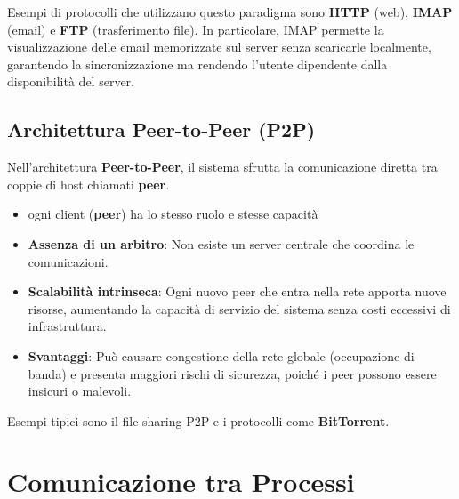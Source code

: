 \documentclass[12pt,a4paper,oneside]{book}
\begin{document}
Esempi di protocolli che utilizzano questo paradigma sono \textbf{HTTP} (web), \textbf{IMAP} (email) e \textbf{FTP} (trasferimento file). In particolare, IMAP permette la visualizzazione delle email memorizzate sul server senza scaricarle localmente, garantendo la sincronizzazione ma rendendo l'utente dipendente dalla disponibilità del server.

\subsection{Architettura Peer-to-Peer (P2P)}

Nell'architettura \textbf{Peer-to-Peer}, il sistema sfrutta la comunicazione diretta tra coppie di host chiamati \textbf{peer}.

\begin{itemize}
    \item ogni client (\textbf{peer}) ha lo stesso ruolo e stesse capacità
    \item \textbf{Assenza di un arbitro}: Non esiste un server centrale che coordina le comunicazioni.
    \item \textbf{Scalabilità intrinseca}: Ogni nuovo peer che entra nella rete apporta nuove risorse, aumentando la capacità di servizio del sistema senza costi eccessivi di infrastruttura.
    \item \textbf{Svantaggi}: Può causare congestione della rete globale (occupazione di banda) e presenta maggiori rischi di sicurezza, poiché i peer possono essere insicuri o malevoli.
\end{itemize}

Esempi tipici sono il file sharing P2P e i protocolli come \textbf{BitTorrent}.

\section{Comunicazione tra Processi}
\end{document}
